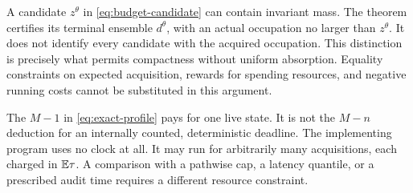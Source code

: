 \begin{remark}\label{rem:ghost}
A candidate $z^\theta$ in \eqref{eq:budget-candidate} can contain invariant mass. The theorem certifies its terminal ensemble $d^\theta$, with an actual occupation no larger than $z^\theta$. It does not identify every candidate with the acquired occupation. This distinction is precisely what permits compactness without uniform absorption. Equality constraints on expected acquisition, rewards for spending resources, and negative running costs cannot be substituted in this argument.
\end{remark}

\begin{remark}
The $M-1$ in \eqref{eq:exact-profile} pays for one live state. It is not the $M-n$ deduction for an internally counted, deterministic deadline. The implementing program uses no clock at all. It may run for arbitrarily many acquisitions, each charged in $\mathbb E\tau$. A comparison with a pathwise cap, a latency quantile, or a prescribed audit time requires a different resource constraint.
\end{remark}
